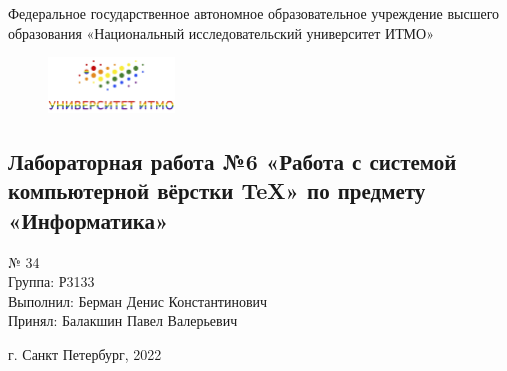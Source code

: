 \begin{center}
\large
Федеральное государственное автономное образовательное учреждение высшего образования
«Национальный исследовательский университет ИТМО»
\end{center}
\begin{figure}[h]
\centering
\includegraphics[width=0.3\textwidth]{itmo_logo.png}
\end{figure}
\vspace{1cm}
\begin{center}
\section*{Лабораторная работа №6 «Работа с системой компьютерной вёрстки \TeX» по предмету \\«Информатика»}
\end{center}
\vspace{9cm}
\begin{flushleft}
 № 34\\Группа: Р3133\\Выполнил: Берман Денис Константинович\\Принял: Балакшин Павел Валерьевич\\
\end{flushleft}
\vspace{3cm}
\begin{center}
\vspace{2cm}
г. Санкт Петербург, 2022
\end{center}
\thispagestyle{empty}
